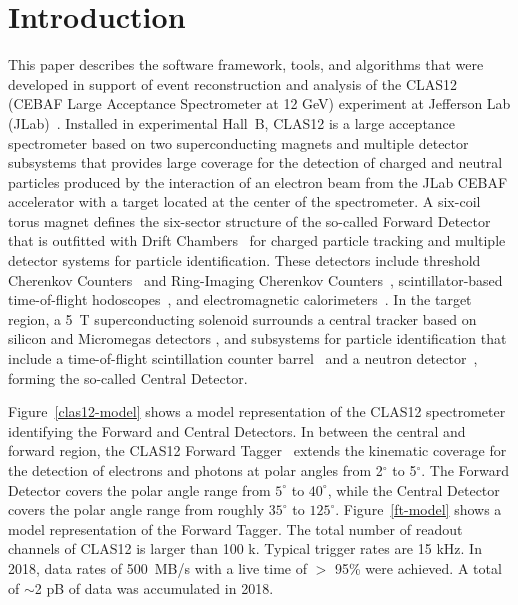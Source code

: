 \section{Introduction}

This paper describes the software framework, tools, and algorithms that were developed in support of event
reconstruction and analysis of the CLAS12 (CEBAF Large Acceptance Spectrometer at 12 GeV) experiment at
Jefferson Lab (JLab)~\cite{clas12-nim}. Installed in experimental Hall~B, CLAS12 is a large acceptance
spectrometer based on two superconducting magnets and multiple detector subsystems that provides large
coverage for the detection of charged and neutral particles produced by the interaction of an electron beam
from the JLab CEBAF accelerator with a target located at the center of the spectrometer. A six-coil torus
magnet defines the six-sector structure of the so-called Forward Detector that is outfitted with Drift
Chambers~\cite{dc-nim} for charged particle tracking and multiple detector systems for particle identification.
These detectors include threshold Cherenkov Counters~\cite{ltcc-nim,htcc-nim} and Ring-Imaging Cherenkov
Counters~\cite{rich-nim}, scintillator-based time-of-flight hodoscopes~\cite{ftof-nim}, and electromagnetic
calorimeters~\cite{ecal-nim}. In the target region, a 5~T superconducting solenoid surrounds a central tracker
based on silicon and Micromegas detectors \cite{svt-nim,mm-nim}, and subsystems for particle identification
that include a time-of-flight scintillation counter barrel~\cite{ctof-nim} and a neutron detector~\cite{cnd-nim},
forming the so-called Central Detector.

Figure~\ref{clas12-model} shows a model representation of the CLAS12 spectrometer identifying the Forward
and Central Detectors. In between the central and forward region, the CLAS12 Forward Tagger~\cite{ft-nim}
extends the kinematic coverage for the detection of electrons and photons at polar angles from 2$^\circ$ to
5$^\circ$. The Forward Detector covers the
polar angle range from $5^\circ$ to $40^\circ$, while the Central Detector covers the polar angle range from
roughly $35^\circ$ to $125^\circ$. Figure~\ref{ft-model} shows a model representation of the Forward Tagger. The total number of
readout channels of CLAS12 is larger than 100 k.
Typical trigger rates are 15 kHz.  In 2018, data rates of  500~MB/s with a live time of $>$ 95\% were achieved.  A total of $\sim$2 pB of data was accumulated in 2018.

